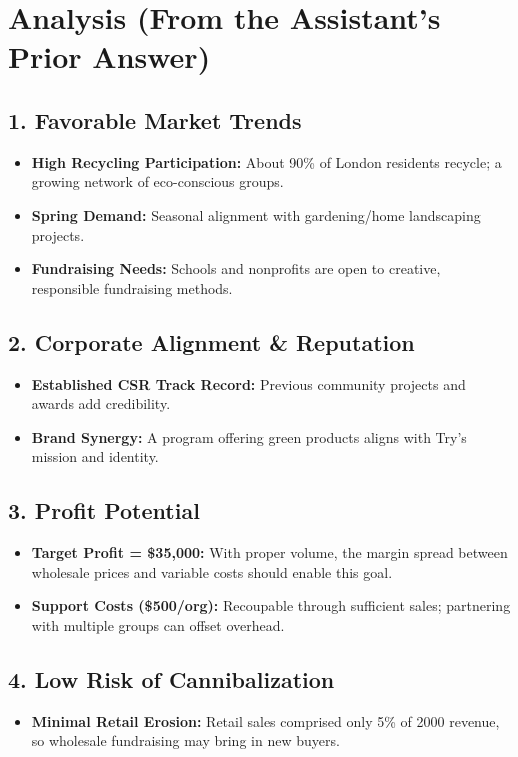 \documentclass[12pt]{article}
\begin{document}
\section*{Analysis (From the Assistant's Prior Answer)}

\subsection*{1. Favorable Market Trends}
\begin{itemize}
    \item \textbf{High Recycling Participation:} About 90\% of London residents recycle; a growing network of eco-conscious groups.
    \item \textbf{Spring Demand:} Seasonal alignment with gardening/home landscaping projects.
    \item \textbf{Fundraising Needs:} Schools and nonprofits are open to creative, responsible fundraising methods.
\end{itemize}

\subsection*{2. Corporate Alignment \& Reputation}
\begin{itemize}
    \item \textbf{Established CSR Track Record:} Previous community projects and awards add credibility.
    \item \textbf{Brand Synergy:} A program offering green products aligns with Try’s mission and identity.
\end{itemize}

\subsection*{3. Profit Potential}
\begin{itemize}
    \item \textbf{Target Profit = \$35,000:} With proper volume, the margin spread between wholesale prices and variable costs should enable this goal.
    \item \textbf{Support Costs (\$500/org):} Recoupable through sufficient sales; partnering with multiple groups can offset overhead.
\end{itemize}

\subsection*{4. Low Risk of Cannibalization}
\begin{itemize}
    \item \textbf{Minimal Retail Erosion:} Retail sales comprised only 5\% of 2000 revenue, so wholesale fundraising may bring in new buyers.
\end{itemize}
\end{document}
